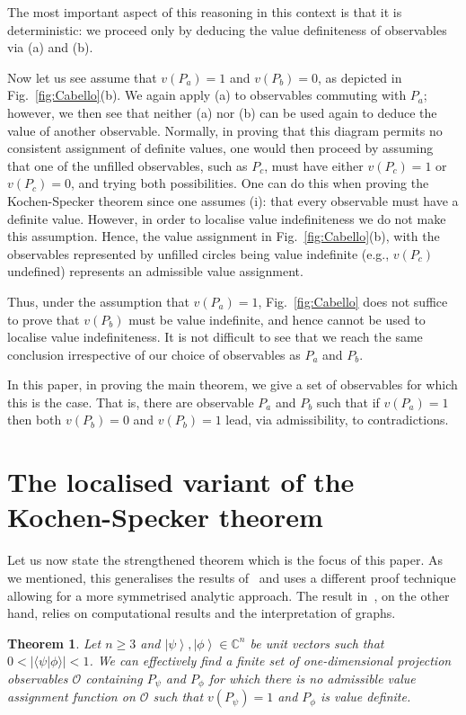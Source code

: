 \documentclass[%
 superscriptaddress,
 preprint,
 showpacs,
 showkeys,
 nofootinbib,
  amsmath,amssymb,
  aps,
  longbibliography,
  floatfix,
 ]{revtex4-1}
\newtheorem{theorem}{Theorem}
\theoremstyle{definition}
\newcommand{\C}{\mathbb{C}}
\newcommand{\ket}[1]{\left| #1 \right>}
\newcommand{\iprod}[2]{\langle #1 | #2 \rangle}
\begin{document}
The most important aspect of this reasoning in this context is that it is deterministic: we proceed only by deducing the value definiteness of observables via (a) and (b).

Now let us see assume that $v(P_a)=1$ and $v(P_b)=0$, as depicted in Fig.~\ref{fig:Cabello}(b).
We again apply (a) to observables commuting with $P_a$;
however, we then see that neither (a) nor (b) can be used again to deduce the value of another observable.
Normally, in proving that this diagram permits no consistent assignment of definite values, one would then proceed by assuming that one of the unfilled observables, such as $P_c$, must have either $v(P_c)=1$ or $v(P_c)=0$, and trying both possibilities.
One can do this when proving the Kochen-Specker theorem since one assumes (i): that every observable must have a definite value.
However, in order to localise value indefiniteness we do not make this assumption.
Hence, the value assignment in Fig.~\ref{fig:Cabello}(b), with the observables represented by unfilled circles being value indefinite (e.g., $v(P_c)$ undefined) represents an admissible value assignment.

Thus, under the assumption that $v(P_a)=1$, Fig.~\ref{fig:Cabello} does not suffice to prove that $v(P_b)$ must be value indefinite,  and hence cannot be used to localise value indefiniteness.
It is not difficult to see that we reach the same conclusion irrespective of our choice of observables as $P_a$ and $P_b$.

In this paper, in proving the main theorem, we give a set of observables for which this is the case.
That is, there are observable $P_a$ and $P_b$ such that if $v(P_a)=1$ then both $v(P_b)=0$ and $v(P_b)=1$ lead, via admissibility, to contradictions.


\section{The localised variant of the Kochen-Specker theorem}

Let us now state the strengthened theorem which is the focus of this paper.
As we mentioned, this generalises the results of~\cite{Abbott:2012fk,Abbott:2013ly} and uses a different proof technique allowing for a more symmetrised analytic approach.
The result in~\cite{Abbott:2013ly}, on the other hand, relies on computational results and the interpretation of graphs.

\begin{theorem}
	\label{thm:main}
    Let $n\ge 3$ and $\ket{\psi}, \ket{\phi}\in \C^n$ be unit vectors such that $0 < |\iprod{\psi}{\phi}| < 1$.
    We can effectively find a finite set of {\color{blue}one-dimensional} projection observables $\mathcal{O}$ containing $P_\psi$ and $P_\phi$
	for which there is no admissible value assignment function on $\mathcal{O}$ such that $v(P_\psi)=1$ and $P_\phi$ is value definite.
\end{theorem}
\end{document}
